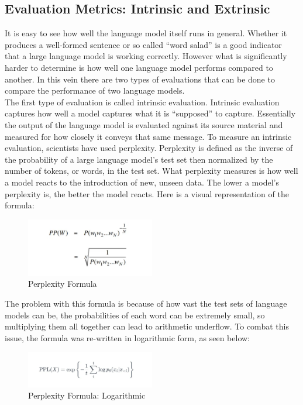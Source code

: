 \documentclass[10pt,twocolumn]{article}
\begin{document}
\subsection{Evaluation Metrics: Intrinsic and Extrinsic}
It is easy to see how well the language model itself runs in general. Whether it produces a well-formed sentence or so called “word salad” is a good indicator that a large language model is working correctly. However what is significantly harder to determine is how well one language model performs compared to another. In this vein there are two types of evaluations that can be done to compare the performance of two language models.\\ \indent The first type of evaluation is called intrinsic evaluation. Intrinsic evaluation captures how well a model captures what it is “supposed” to capture. Essentially the output of the language model is evaluated against its source material and measured for how closely it conveys that same message. To measure an intrinsic evaluation, scientists have used perplexity. Perplexity is defined as the inverse of the probability of a large language model’s test set then normalized by the number of tokens, or words, in the test set. What perplexity measures is how well a model reacts to the introduction of new, unseen data. The lower a model's perplexity is, the better the model reacts\cite{gandhi_evaluation_2020}. Here is a visual representation of the formula:
\\
\begin{figure}[h]
    \centering
    \includegraphics[width=0.5\textwidth]{Images/Perplexity.png}
    \caption{Perplexity Formula}
    \label{fig:example_image}
\end{figure}

The problem with this formula is because of how vast the test sets of language models can be, the probabilities of each word can be extremely small, so multiplying them all together can lead to arithmetic underflow. To combat this issue, the formula was re-written in logarithmic form, as seen below\cite{gandhi_evaluation_2020}: 
\\
\begin{figure}[h]
    \centering
    \includegraphics[width=0.5\textwidth]{Images/Log_Plex.png}
    \caption{Perplexity Formula: Logarithmic}
    \label{fig:example_image}
\end{figure}
\end{document}
